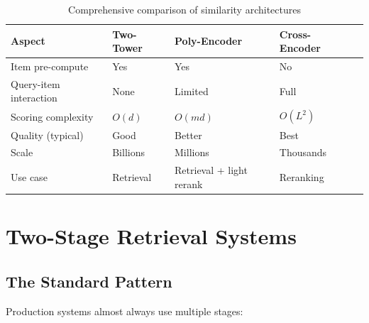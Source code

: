 \begin{table}[H]
\centering
\caption{Comprehensive comparison of similarity architectures}
\begin{tabularx}{\textwidth}{lXXXX}
\toprule
\textbf{Aspect} & \textbf{Two-Tower} & \textbf{Poly-Encoder} & \textbf{Cross-Encoder} \\
\midrule
Item pre-compute & Yes & Yes & No \\
Query-item interaction & None & Limited & Full \\
Scoring complexity & $O(d)$ & $O(md)$ & $O(L^2)$ \\
Quality (typical) & Good & Better & Best \\
Scale & Billions & Millions & Thousands \\
Use case & Retrieval & Retrieval + light rerank & Reranking \\
\bottomrule
\end{tabularx}
\end{table}

\section{Two-Stage Retrieval Systems}
\label{sec:two_stage}

\subsection{The Standard Pattern}

Production systems almost always use multiple stages:


